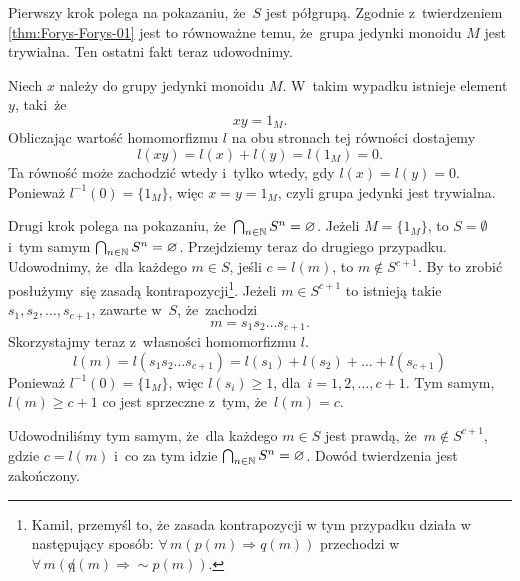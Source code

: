 \documentclass[a4paper,11pt]{article}
\begin{document}
Pierwszy krok polega na pokazaniu, że~$S$ jest półgrupą. Zgodnie
z~twierdzeniem \eqref{thm:Forys-Forys-01} jest to równoważne temu,
że~grupa jedynki monoidu $M$ jest trywialna. Ten ostatni fakt teraz
udowodnimy.

Niech $x$ należy do grupy jedynki monoidu $M$. W~takim wypadku
istnieje element $y$, taki~że
\begin{equation}
  \label{eq:Forys-Forys-55}
  x y = 1_{ M }.
\end{equation}
Obliczając wartość homomorfizmu $l$ na obu stronach tej równości
dostajemy
\begin{equation}
  \label{eq:Forys-Forys-56}
  l( x y ) = l( x ) + l( y ) = l( 1_{ M } ) = 0.
\end{equation}
Ta równość może zachodzić wtedy i~tylko wtedy, gdy
$l( x ) = l( y ) = 0$. Ponieważ $l^{ -1 }( 0 ) = \{ 1_{ M } \}$, więc
$x = y = 1_{ M }$, czyli grupa jedynki jest trywialna.

Drugi krok polega na pokazaniu,
że~$\bigcap_{ n \in \mathbb{N} } S^{ n } = \varnothing$. Jeżeli
$M = \{ 1_{ M } \}$, to $S = \emptyset$ i~tym samym
$\bigcap_{ n \in \mathbb{N} } S^{ n } = \varnothing$. Przejdziemy teraz do
drugiego przypadku. Udowodnimy, że~dla każdego $m \in S$, jeśli
$c = l( m )$, to $m \notin S^{ c + 1 }$. By to zrobić posłużymy~się
zasadą kontrapozycji\footnote{Kamil, przemyśl to, że zasada
  kontrapozycji w tym przypadku działa w następujący sposób:
  $\forall \, m ( p( m ) \Rightarrow q( m ) )$ przechodzi
  w~$\forall \, m ( \not q( m ) \Rightarrow \sim p( m ) )$.}. Jeżeli
$m \in S^{ c + 1 }$ to istnieją takie
$s_{ 1 }, s_{ 2 }, \ldots, s_{ c + 1 }$, zawarte w~$S$, że~zachodzi
\begin{equation}
  \label{eq:Forys-Forys-57}
  m = s_{ 1 } s_{ 2 } \ldots s_{ c + 1 }.
\end{equation}
Skorzystajmy teraz z~własności homomorfizmu $l$.
\begin{equation}
  \label{eq:Forys-Forys-58}
  l( m ) = l( s_{ 1 } s_{ 2 } \ldots s_{ c + 1 } ) =
  l( s_{ 1 } ) + l( s_{ 2 } ) + \ldots + l( s_{ c + 1 } )
\end{equation}
Ponieważ $l^{ -1 }( 0 ) = \{ 1_{ M } \}$, więc $l( s_{ i } ) \geq 1$,
dla~$i = 1, 2, \ldots, c + 1$. Tym samym, $l( m ) \geq c + 1$ co jest
sprzeczne z~tym, że~$l( m ) = c$.

Udowodniliśmy tym samym, że~dla każdego $m \in S$ jest prawdą,
że~$m \notin S^{ c + 1 }$, gdzie $c = l( m )$ i~co za tym idzie
$\bigcap_{ n \in \mathbb{N} } S^{ n } = \varnothing$. Dowód twierdzenia jest zakończony.
\end{document}
